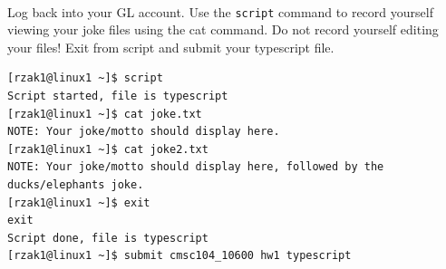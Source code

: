 \documentclass[letter,11pt]{article}
\begin{document}
\paragraph{}Log back into your GL account. Use the \texttt{script} command to record yourself viewing your joke files using the cat command. Do not record yourself editing your files! Exit from script and submit your typescript file.
\begin{verbatim}
[rzak1@linux1 ~]$ script
Script started, file is typescript
[rzak1@linux1 ~]$ cat joke.txt
NOTE: Your joke/motto should display here.
[rzak1@linux1 ~]$ cat joke2.txt
NOTE: Your joke/motto should display here, followed by the ducks/elephants joke.
[rzak1@linux1 ~]$ exit
exit
Script done, file is typescript
[rzak1@linux1 ~]$ submit cmsc104_10600 hw1 typescript
\end{verbatim}
\end{document}
